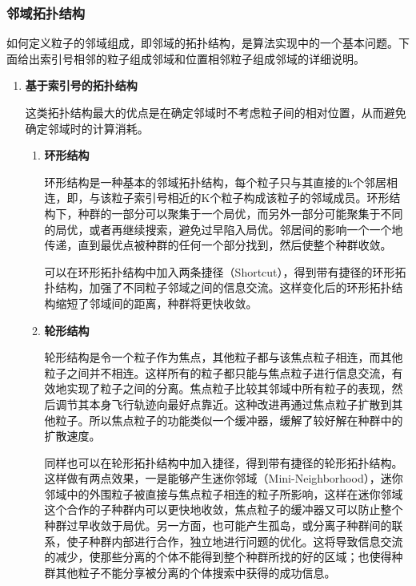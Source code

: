 \subsubsection{邻域拓扑结构}
如何定义粒子的邻域组成，即邻域的拓扑结构，是算法实现中的一个基本问题。下面给出索引号相邻的粒子组成邻域和位置相邻粒子组成邻域的详细说明。
\begin{enumerate}
	\item \textbf{基于索引号的拓扑结构}
	
	\hspace{2em}这类拓扑结构最大的优点是在确定邻域时不考虑粒子间的相对位置，从而避免确定邻域时的计算消耗。
	
	\begin{enumerate}
		\item \textbf{环形结构}
		
		\hspace{2em}环形结构是一种基本的邻域拓扑结构，每个粒子只与其直接的k个邻居相连，即，与该粒子索引号相近的K个粒子构成该粒子的邻域成员。环形结构下，种群的一部分可以聚集于一个局优，而另外一部分可能聚集于不同的局优，或者再继续搜索，避免过早陷入局优。邻居间的影响一个一个地传递，直到最优点被种群的任何一个部分找到，然后使整个种群收敛。
		
		\hspace{2em}可以在环形拓扑结构中加入两条捷径（Shortcut），得到带有捷径的环形拓扑结构，加强了不同粒子邻域之间的信息交流。这样变化后的环形拓扑结构缩短了邻域间的距离，种群将更快收敛。
		
		\item \textbf{轮形结构}
		
		\hspace{2em}轮形结构是令一个粒子作为焦点，其他粒子都与该焦点粒子相连，而其他粒子之间并不相连。这样所有的粒子都只能与焦点粒子进行信息交流，有效地实现了粒子之间的分离。焦点粒子比较其邻域中所有粒子的表现，然后调节其本身飞行轨迹向最好点靠近。这种改进再通过焦点粒子扩散到其他粒子。所以焦点粒子的功能类似一个缓冲器，缓解了较好解在种群中的扩散速度。
		
		\hspace{2em}同样也可以在轮形拓扑结构中加入捷径，得到带有捷径的轮形拓扑结构。这样做有两点效果，一是能够产生迷你邻域（Mini-Neighborhood），迷你邻域中的外围粒子被直接与焦点粒子相连的粒子所影响，这样在迷你邻域这个合作的子种群内可以更快地收敛，焦点粒子的缓冲器又可以防止整个种群过早收敛于局优。另一方面，也可能产生孤岛，或分离子种群间的联系，使子种群内部进行合作，独立地进行问题的优化。这将导致信息交流的减少，使那些分离的个体不能得到整个种群所找的好的区域；也使得种群其他粒子不能分享被分离的个体搜索中获得的成功信息。
		

\end{enumerate}
\end{enumerate}
